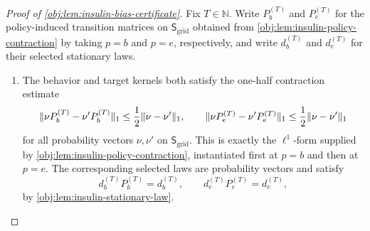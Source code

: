 \documentclass[11pt]{article}
\begin{document}
\begin{proof}[Proof of \cref{obj:lem:insulin-bias-certificate}]
Fix \(T\in\mathbb N\). Write \(P_b^{(T)}\) and \(P_e^{(T)}\) for the policy-induced transition matrices on \(\mathsf S_{\mathrm{grid}}\) obtained from \cref{obj:lem:insulin-policy-contraction} by taking \(p=b\) and \(p=e\), respectively, and write \(d_b^{(T)}\) and \(d_e^{(T)}\) for their selected stationary laws.

\begin{enumerate}
\item The behavior and target kernels both satisfy the one-half contraction estimate
\[
\|\nu P_b^{(T)}-\nu'P_b^{(T)}\|_1
\le {1\over2}\|\nu-\nu'\|_1,
\qquad
\|\nu P_e^{(T)}-\nu'P_e^{(T)}\|_1
\le {1\over2}\|\nu-\nu'\|_1
\]
for all probability vectors \(\nu,\nu'\) on \(\mathsf S_{\mathrm{grid}}\). This is exactly the \(\ell^1\)-form supplied by \cref{obj:lem:insulin-policy-contraction}, instantiated first at \(p=b\) and then at \(p=e\). The corresponding selected laws are probability vectors and satisfy
\[
d_b^{(T)}P_b^{(T)}=d_b^{(T)},
\qquad
d_e^{(T)}P_e^{(T)}=d_e^{(T)},
\]
by \cref{obj:lem:insulin-stationary-law}.


\end{enumerate}
\end{proof}
\end{document}
